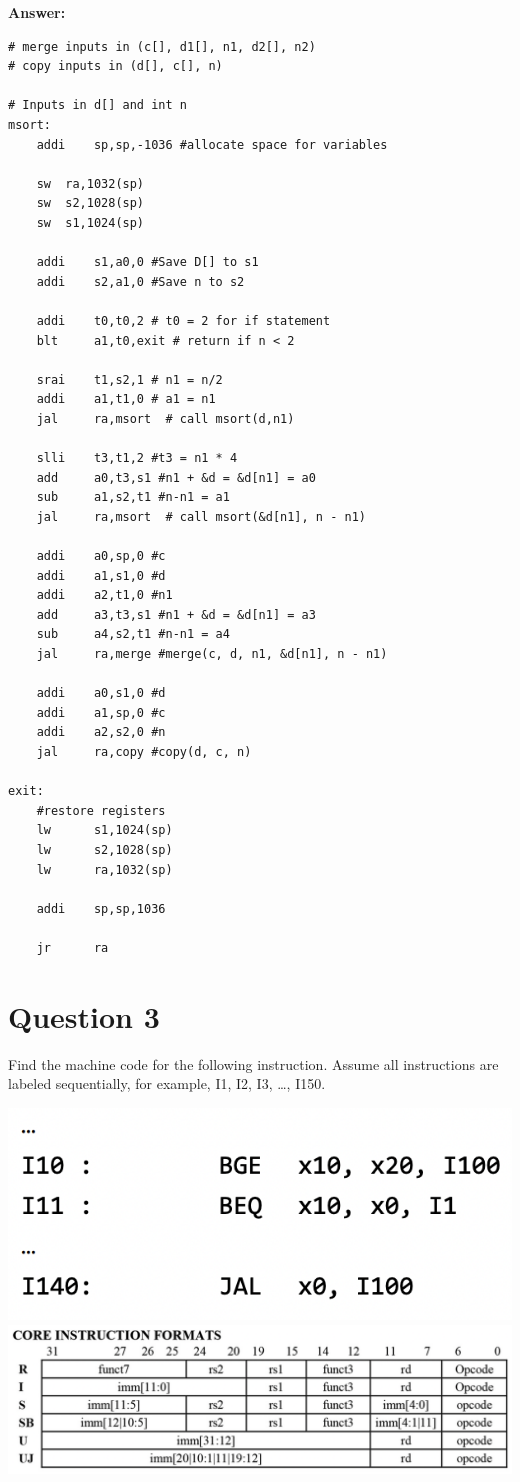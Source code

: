 \documentclass{article}
\begin{document}
\textbf{Answer:}
\begin{lstlisting}
# merge inputs in (c[], d1[], n1, d2[], n2)
# copy inputs in (d[], c[], n)

# Inputs in d[] and int n
msort:
	addi	sp,sp,-1036 #allocate space for variables
	
	sw	ra,1032(sp)
	sw	s2,1028(sp)
	sw	s1,1024(sp) 
	
	addi	s1,a0,0 #Save D[] to s1
	addi	s2,a1,0 #Save n to s2
	
	addi	t0,t0,2 # t0 = 2 for if statement
	blt		a1,t0,exit # return if n < 2

	srai	t1,s2,1 # n1 = n/2
	addi	a1,t1,0 # a1 = n1
	jal     ra,msort  # call msort(d,n1)
	
	slli	t3,t1,2 #t3 = n1 * 4
	add     a0,t3,s1 #n1 + &d = &d[n1] = a0
	sub     a1,s2,t1 #n-n1 = a1
	jal     ra,msort  # call msort(&d[n1], n - n1)
	
	addi    a0,sp,0 #c
	addi    a1,s1,0 #d
	addi    a2,t1,0 #n1
	add     a3,t3,s1 #n1 + &d = &d[n1] = a3
	sub     a4,s2,t1 #n-n1 = a4
	jal     ra,merge #merge(c, d, n1, &d[n1], n - n1)
	
	addi	a0,s1,0 #d
	addi	a1,sp,0 #c
	addi	a2,s2,0 #n
	jal     ra,copy #copy(d, c, n)
	
exit:
	#restore registers
	lw      s1,1024(sp) 
	lw      s2,1028(sp)
	lw      ra,1032(sp)
	
	addi    sp,sp,1036 
	
	jr      ra
\end{lstlisting}

\section*{Question 3}
Find the machine code for the following instruction. Assume all instructions are labeled
sequentially, for example, I1, I2, I3, …, I150. 

\begin{center}
    \includegraphics[scale=.75]{images/Q3.png}
    \includegraphics[scale=.3]{images/greencard.png}
\end{center}
\end{document}
